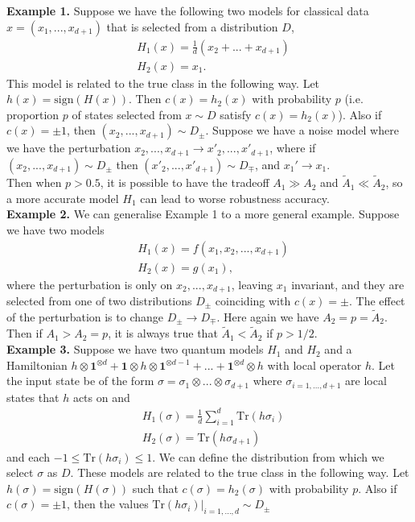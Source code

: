\documentclass[onecolumn,prx, superscriptaddress,longbibliography,margin=1mm 11pt]{revtex4-2}
\renewcommand{\mathbf}[1]{\boldsymbol{#1}}
\begin{document}
\noindent \textbf{Example 1.}
    Suppose we have the following two models for classical data $x=(x_1,...,x_{d+1})$ that is selected from a distribution $D$, 
\begin{align}
    & H_1(x)=\frac{1}{d}(x_2+...+x_{d+1})\nonumber \\
    & H_2(x)=x_1.
\end{align}
This model is related to the true class in the following way. Let $h(x)=\text{sign}(H(x))$. Then $c(x)=h_2(x)$ with probability $p$ (i.e. proportion $p$ of states selected from $x \sim D$ satisfy $c(x)=h_2(x)$). Also if $c(x)=\pm 1$, then $(x_2,...,x_{d+1}) \sim D_{\pm}$. Suppose we have a noise model where we have the perturbation $x_2,...,x_{d+1} \rightarrow x'_2,...,x'_{d+1}$, where if  $(x_2,...,x_{d+1}) \sim D_{\pm}$ then $(x'_2,...,x'_{d+1}) \sim D_{\mp}$, and $x_1' \rightarrow x_1$. \\

Then when $p>0.5$, it is possible to have the tradeoff $A_1 \gg A_2$ and $\tilde{A}_1 \ll \tilde{A}_2$, so a more accurate model $H_1$ can lead to worse robustness accuracy. \\


\noindent \textbf{Example 2.}
    We can generalise Example 1 to a more general example. Suppose we have two models 
\begin{align}
    & H_1(x)=f(x_1, x_2,...,x_{d+1}) \nonumber \\
    & H_2(x)=g(x_1),
\end{align}
where the perturbation is only on $x_2,...,x_{d+1}$, leaving $x_1$ invariant, and they are selected from one of two distributions $D_{\pm}$ coinciding with $c(x)=\pm$. The effect of the perturbation is to change $D_{\pm} \rightarrow D_{\mp}$. Here again we have $A_2=p=\tilde{A}_2$. Then if $A_1>A_2=p$, it is always true that $\tilde{A}_1<\tilde{A}_2$ if $p>1/2$. \\ 

\noindent \textbf{Example 3.}
    Suppose we have two quantum models $H_1$ and $H_2$ and a Hamiltonian $h\otimes \mathbf{1}^{\otimes d}+\mathbf{1}\otimes h \otimes \mathbf{1}^{\otimes d-1}+...+\mathbf{1}^{\otimes d} \otimes h$ with local operator $h$. Let the input state be of the form $\sigma=\sigma_1 \otimes...\otimes \sigma_{d+1}$ where $\sigma_{i=1,...,d+1}$ are local states that $h$ acts on and 
    \begin{align}
   & H_1(\sigma)=\frac{1}{d}\sum_{i=1}^{d} \text{Tr}(h \sigma_i) \nonumber \\
   & H_2(\sigma)=\text{Tr}(h \sigma_{d+1})
\end{align}
and each $-1 \leq \text{Tr}(h \sigma_i) \leq 1$. 
We can define the distribution from which we select $\sigma$ as $D$. These models are related to the true class in the following way. Let $h(\sigma)=\text{sign}(H(\sigma))$ such that $c(\sigma)=h_2(\sigma)$ with probability $p$. Also if $c(\sigma)=\pm 1$, then the values $\text{Tr}(h \sigma_i) \vert_{i=1,...,d} \sim D_{\pm}$ \\
\end{document}
